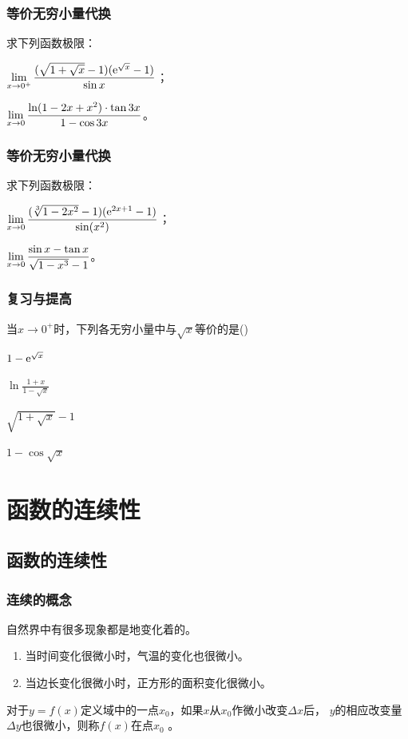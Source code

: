 \documentclass[14pt,notheorems,leqno,xcolor={rgb}]{beamer} %
\begin{document}
\begin{frame}
\frametitle{等价无穷小量代换}
\begin{review}
求下列函数极限：
\begin{enumlite}
  \item $\lim\limits_{x\to0^+}\dfrac{(\sqrt{1+\sqrt{x}}-1)(\mathrm{e}^{\sqrt{x}}-1)}{\sin x}$；
  \item $\lim\limits_{x\to0}\dfrac{\ln(1-2x+x^2)\cdot\tan3x}{1-\cos3x}$。
\end{enumlite}
\end{review}
\end{frame}

\begin{frame}
\frametitle{等价无穷小量代换}
\begin{review}
求下列函数极限：
\begin{enumlite}
  \item $\lim\limits_{x\to0}\dfrac{(\sqrt[3]{1-2x^2}-1)(\mathrm{e}^{2x+1}-1)}{\sin(x^2)}$；
  \item $\lim\limits_{x\to0}\dfrac{\sin x-\tan x}{\sqrt{1-x^3}-1}$。
\end{enumlite}
\end{review}
\end{frame}

\begin{frame}
\frametitle{复习与提高}
\begin{choice}
当$x\to0^+$时，下列各无穷小量中与$\sqrt{x}$等价的是\dotfill()
\begin{choicehalf}
  \item $1-\mathrm{e}^{\sqrt{x}}$ ~
  \item $\ln\frac{1+x}{1-\sqrt{x}}$ ~
  \item $\sqrt{1+\sqrt{x}}-1$ ~
  \item $1-\cos\sqrt{x}$ ~ 
\end{choicehalf}
\end{choice}
\end{frame}

\section{函数的连续性}

\subsection{函数的连续性}

\begin{frame}
\frametitle{连续的概念}
\begin{example*}
自然界中有很多现象都是地变化着的。
\begin{enumerate}
  \item 当时间变化很微小时，气温的变化也很微小。
  \item 当边长变化很微小时，正方形的面积变化很微小。
\end{enumerate}
\end{example*}
\vpause
对于$y=f(x)$定义域中的一点$x_0$，如果$x$从$x_0$作微小改变$\Delta x$后，
$y$的相应改变量$\Delta y$也很微小，则称$f(x)$在点$x_0$ 。
\end{frame}
\end{document}
